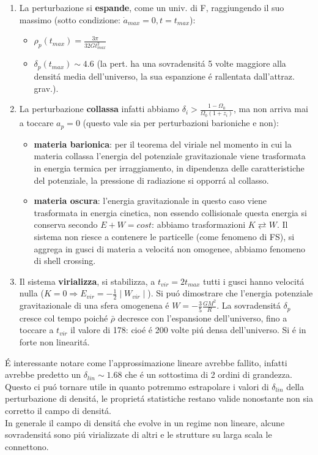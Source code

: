 \documentclass[12pt, a4paper]{article}
\begin{document}
\begin{enumerate}
\item La perturbazione si \textbf{espande}, come un univ. di F, raggiungendo il suo massimo (sotto condizione: $\dot{a}_{max}=0, t=t_{max}$):
\begin{itemize}
\item $\rho_p(t_{max})=\frac{3\pi}{32 G t^2_{max}}$
\item $\delta_p(t_{max})\sim 4.6$ (la pert. ha una sovradensit\'{a} 5 volte maggiore alla densit\'{a} media dell'universo, la sua espanzione \'{e} rallentata dall'attraz. grav.).
\end{itemize}
\item La perturbazione \textbf{collassa} infatti abbiamo $\delta_i>\frac{1-\Omega_0}{\Omega_0(1+z_i)}$, ma non arriva mai a toccare $a_p=0$ (questo vale sia per perturbazioni barioniche e non):
\begin{itemize}
\item \textbf{materia barionica}: per il teorema del viriale nel momento in cui la materia collassa l'energia del potenziale gravitazionale viene trasformata in energia termica per irraggiamento, in dipendenza delle caratteristiche del potenziale, la pressione di radiazione si opporr\'{a} al collasso.
\item \textbf{materia oscura}: l'energia gravitazionale in questo caso viene trasformata in energia cinetica, non essendo collisionale questa energia si conserva secondo $ E+W=cost $: abbiamo trasformazioni $K \rightleftarrows W$. Il sistema non riesce a contenere le particelle (come fenomeno di FS), si aggrega in gusci di materia a velocit\'{a} non omogenee, abbiamo fenomeno di shell crossing. 
\end{itemize}
\item Il sistema \textbf{virializza}, si stabilizza, a $t_{vir}=2t_{max}$ tutti i gusci hanno velocit\'{a} nulla ($K=0 \Rightarrow E_{vir}= -\frac{1}{2}\mid W_{vir}\mid $). Si pu\'{o} dimostrare che l'energia potenziale gravitazionale di una sfera omogenena \'{e} $W=-\frac{3}{5}\frac{GM^2}{R}$. La sovradensit\'{a} $\delta_p $ cresce col tempo poich\'{e} $\bar{\rho}$ decresce con l'espansione dell'universo, fino a toccare a $t_{vir}$ il valore di 178: cio\'{e} \'{e } 200 volte pi\'{u} densa dell'universo. Si \'{e} in forte non linearit\'{a}.
\end{enumerate}
\'{E} interessante notare come l'approssimazione lineare avrebbe fallito, infatti avrebbe predetto un $\delta_{lin}\sim 1.68$ che \'{e} un sottostima di 2 ordini di grandezza. Questo ci pu\'{o} tornare utile in quanto potremmo estrapolare i valori di $\delta_{lin}$ della perturbazione di densit\'{a}, le propriet\'{a} statistiche restano valide nonostante non sia corretto il campo di densit\'{a}.\\
In generale il campo di densit\'{a} che evolve in un regime non lineare, alcune sovradensit\'{a} sono pi\'{u} virializzate di altri e le strutture su larga scala le connettono. 
\end{document}
